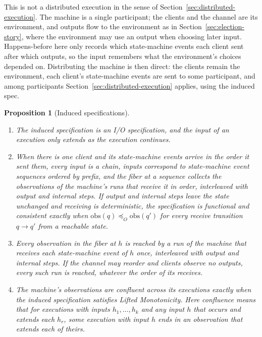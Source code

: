 \documentclass[sigconf]{cidr-2027}
\newtheorem{proposition}{Proposition}
\theoremstyle{remark}
\newcommand{\OutputOrd}{\preceq_O}
\newcommand{\outrel}{extends\xspace}          %
\newcommand{\spectype}[1][]{I/O specification#1\xspace}
\begin{document}
\color{blue!70!black}This is not a distributed execution in the sense of
Section~\ref{sec:distributed-execution}.  The machine is a single
participant; the clients and the channel are its environment, and outputs
flow to the environment as in Section~\ref{sec:election-story}, where the
environment may use an output when choosing later input.  Happens-before here
only records which state-machine events each client sent after which
outputs, so the input remembers what the environment's choices depended on.
Distributing the machine is then direct: the clients remain the environment,
each client's state-machine events are sent to some participant, and among participants
Section~\ref{sec:distributed-execution} applies, using the induced
spec.\color{black}

\color{blue!70!black}\begin{proposition}[Induced specifications]
\label{prop:induced-specification}
\leavevmode
\begin{enumerate}
  \item The induced specification is an \spectype, and the input
        of an execution only extends as the execution continues.
  \item When there is one client and its state-machine events arrive in the order it sent
        them, every input is a chain, inputs correspond to state-machine event sequences
        ordered by prefix, and the fiber at a sequence collects the
        observations of the machine's runs that receive it in order,
        interleaved with output and internal steps.  If output and internal
        steps leave the state unchanged and receiving is deterministic, the
        specification is functional and consistent exactly when
        $\mathrm{obs}(q)\OutputOrd\mathrm{obs}(q')$ for every receive
        transition $q\to q'$ from a reachable state.
  \item Every observation in the fiber at $h$ is reached by a run of the
        machine that receives each state-machine event of $h$ once, interleaved with output
        and internal steps.  If the channel may reorder and clients observe no
        outputs, every such run is reached, whatever the order of its
        receives.
  \item The machine's observations are confluent across its executions
        exactly when the induced specification satisfies Lifted Monotonicity.
        Here confluence means that for executions with inputs
        $h_1,\ldots,h_k$ and any input $h$ that occurs and extends each $h_r$,
        some execution with input $h$ ends in an observation that \outrel
        each of theirs.\color{black}
\end{enumerate}
\end{proposition}
\end{document}
